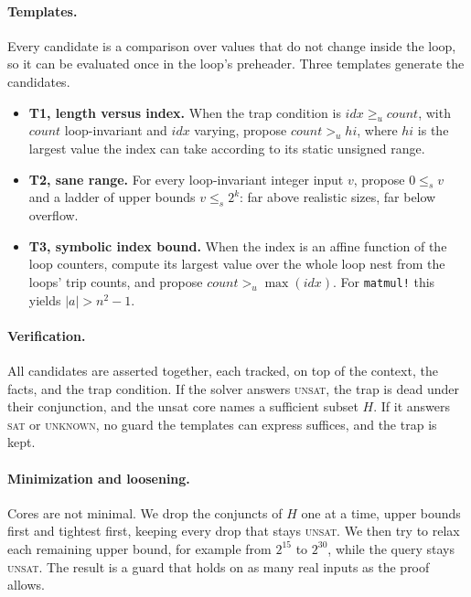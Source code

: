 \documentclass[acmsmall,screen,nonacm]{acmart}
\begin{document}
\paragraph{Templates.} Every candidate is a comparison over values that
do not change inside the loop, so it can be evaluated once in the loop's
preheader. Three templates generate the candidates.
\begin{itemize}
\item \textbf{T1, length versus index.} When the trap condition is
  $\mathit{idx} \ge_u \mathit{count}$, with $\mathit{count}$
  loop-invariant and $\mathit{idx}$ varying, propose
  $\mathit{count} >_u \mathit{hi}$, where $\mathit{hi}$ is the largest
  value the index can take according to its static unsigned range.
\item \textbf{T2, sane range.} For every loop-invariant integer input
  $v$, propose $0 \le_s v$ and a ladder of upper bounds $v \le_s 2^k$:
  far above realistic sizes, far below overflow.
\item \textbf{T3, symbolic index bound.} When the index is an affine
  function of the loop counters, compute its largest value over the
  whole loop nest from the loops' trip counts, and propose
  $\mathit{count} >_u \max(\mathit{idx})$. For \texttt{matmul!} this
  yields $|a| > n^2 - 1$.
\end{itemize}

\paragraph{Verification.} All candidates are asserted together, each
tracked, on top of the context, the facts, and the trap condition. If
the solver answers \textsc{unsat}, the trap is dead under their
conjunction, and the unsat core names a sufficient subset $H$. If it
answers \textsc{sat} or \textsc{unknown}, no guard the templates can
express suffices, and the trap is kept.

\paragraph{Minimization and loosening.} Cores are not minimal. We drop
the conjuncts of $H$ one at a time, upper bounds first and tightest
first, keeping every drop that stays \textsc{unsat}. We then try to
relax each remaining upper bound, for example from $2^{15}$ to $2^{30}$,
while the query stays \textsc{unsat}. The result is a guard that holds
on as many real inputs as the proof allows.
\end{document}
